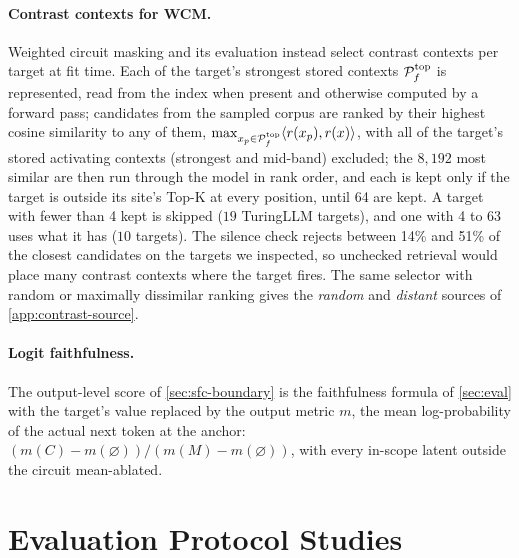 \documentclass[10pt]{article}
\begin{document}
\paragraph{Contrast contexts for WCM.}
Weighted circuit masking and its evaluation instead select contrast contexts per target at fit time.
Each of the target's strongest stored contexts $\mathcal{P}_f^{\mathrm{top}}$ is represented, read from the index when present and otherwise computed by a forward pass; candidates from the sampled corpus are ranked by their highest cosine similarity to any of them, $\max_{x_p \in \mathcal{P}_f^{\mathrm{top}}} \langle r(x_p), r(x) \rangle$, with all of the target's stored activating contexts (strongest and mid-band) excluded; the $8{,}192$ most similar are then run through the model in rank order, and each is kept only if the target is outside its site's Top-K at every position, until 64 are kept.
A target with fewer than 4 kept is skipped ($19$ TuringLLM targets), and one with 4 to 63 uses what it has ($10$ targets).
The silence check rejects between 14\% and 51\% of the closest candidates on the targets we inspected, so unchecked retrieval would place many contrast contexts where the target fires.
The same selector with random or maximally dissimilar ranking gives the \emph{random} and \emph{distant} sources of \cref{app:contrast-source}.

\paragraph{Logit faithfulness.}
\label{app:logit-faith}
The output-level score of \cref{sec:sfc-boundary} is the faithfulness formula of \cref{sec:eval} with the target's value replaced by the output metric $m$, the mean log-probability of the actual next token at the anchor: $(m(C) - m(\varnothing)) / (m(M) - m(\varnothing))$, with every in-scope latent outside the circuit mean-ablated.

\section{Evaluation Protocol Studies}
\label{app:eval-protocol}
\end{document}
